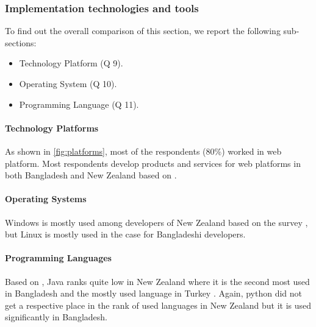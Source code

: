 \subsubsection{Implementation technologies and tools}
\label{implementaion_techonologies}

To find out the overall comparison of this section, we report the following sub-sections:
\begin{itemize}
\item Technology Platform (Q 9).
\item Operating System (Q 10).
\item Programming Language (Q 11).
\end{itemize}


\paragraph{Technology Platforms}
As shown in \ref{fig:platforms}, most of the respondents (80\%) worked in web platform. Most respondents develop products and services for web platforms in both Bangladesh and New Zealand based on \cite{Wang2018}.

\paragraph{Operating Systems}
Windows is mostly used among developers of New Zealand based on the survey \cite{Wang2018}, but Linux is mostly used in the case for Bangladeshi developers.

\paragraph{Programming Languages}
Based on \cite{Wang2018}, Java ranks quite low in New Zealand where it is the second most used in Bangladesh and the mostly used language in Turkey \cite{Garousi2015}. Again, python did not get a respective place in the rank of used languages in New Zealand but it is used significantly in Bangladesh.
